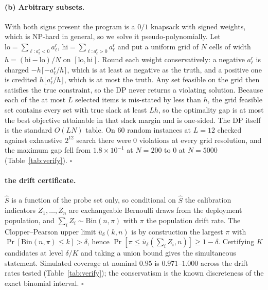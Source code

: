 \documentclass[10pt]{article}
\theoremstyle{plain}
\theoremstyle{definition}
\theoremstyle{remark}
\newcommand{\risk}{\mathsf{r}}
\begin{document}
\paragraph{(b) Arbitrary subsets.}
With both signs present the program is a $0/1$ knapsack with signed weights,
which is NP-hard in general, so we solve it pseudo-polynomially. Let
$\mathrm{lo}=\sum_{\ell: a^{\risk}_\ell<0}a^{\risk}_\ell$,
$\mathrm{hi}=\sum_{\ell: a^{\risk}_\ell>0}a^{\risk}_\ell$ and put a uniform grid
of $N$ cells of width $h=(\mathrm{hi}-\mathrm{lo})/N$ on $[\mathrm{lo},\mathrm{hi}]$.
Round each weight conservatively: a negative $a^{\risk}_\ell$ is charged
$-h\lceil -a^{\risk}_\ell/h\rceil$, which is at least as negative as the truth,
and a positive one is credited $h\lfloor a^{\risk}_\ell/h\rfloor$, which is at
most the truth. Any set feasible on the grid then satisfies the true constraint,
so the DP never returns a violating solution. Because each of the at most $L$
selected items is mis-stated by less than $h$, the grid feasible set contains
every set with true slack at least $Lh$, so the optimality gap is at most the
best objective attainable in that slack margin and is one-sided. The DP itself
is the standard $O(LN)$ table. On $60$ random instances at $L=12$ checked
against exhaustive $2^{12}$ search there were $0$ violations at every grid
resolution, and the maximum gap fell from $1.8\times10^{-1}$ at $N=200$ to
$0$ at $N=5000$ (Table~\ref{tab:verify}). \hfill$\square$

\paragraph{the drift certificate.}
$\widehat{S}$ is a function of the probe set only, so conditional on
$\widehat{S}$ the calibration indicators $Z_1,\dots,Z_n$ are exchangeable
Bernoulli draws from the deployment population, and
$\sum_i Z_i \sim \mathrm{Bin}(n, \pi)$ with $\pi$ the population drift rate. The
Clopper--Pearson upper limit $\bar{u}_\delta(k,n)$ is by construction the
largest $\pi$ with $\Pr[\mathrm{Bin}(n,\pi)\le k]>\delta$, hence
$\Pr[\pi\le\bar{u}_\delta(\sum_i Z_i,n)]\ge 1-\delta$. Certifying $K$
candidates at level $\delta/K$ and taking a union bound gives the simultaneous
statement. Simulated coverage at nominal $0.95$ is $0.971$--$1.000$ across the
drift rates tested (Table~\ref{tab:verify}); the conservatism is the known
discreteness of the exact binomial interval. \hfill$\square$

\end{document}
